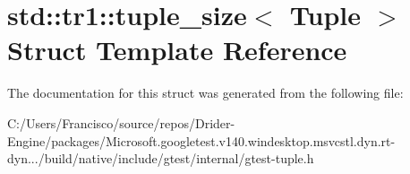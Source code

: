 \hypertarget{structstd_1_1tr1_1_1tuple__size}{}\section{std\+:\+:tr1\+:\+:tuple\+\_\+size$<$ Tuple $>$ Struct Template Reference}
\label{structstd_1_1tr1_1_1tuple__size}


The documentation for this struct was generated from the following file\+:\begin{DoxyCompactItemize}
\item 
C\+:/\+Users/\+Francisco/source/repos/\+Drider-\/\+Engine/packages/\+Microsoft.\+googletest.\+v140.\+windesktop.\+msvcstl.\+dyn.\+rt-\/dyn.../build/native/include/gtest/internal/gtest-\/tuple.\+h\end{DoxyCompactItemize}
